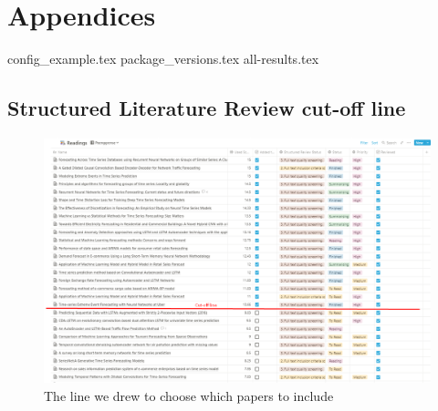 
\chapter{Appendices}
\label{cha:appendices}
{config_example.tex}
{package_versions.tex}
{all-results.tex}

\section{Structured Literature Review cut-off line}
\label{cha:slr-cut-off-line}

\begin{figure}[h!]
  \centering
  \includegraphics[width=\textwidth]{./figs/illustrations/LSR-cut-off-line.png}
  \hfill
  \caption{The line we drew to choose which papers to include}
  \label{fig:slr-cut-off-line}
\end{figure}

